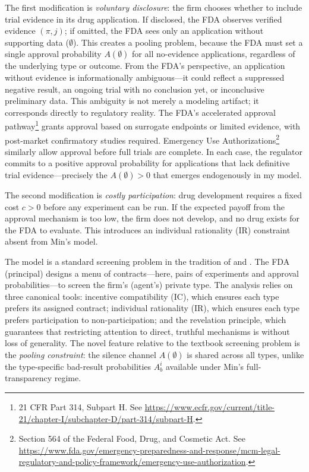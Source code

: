 \documentclass[12pt,a4paper]{article}
\begin{document}
The first modification is \emph{voluntary disclosure}: the
firm chooses whether to include trial evidence in its drug
application. If disclosed, the FDA observes verified evidence
$(\pi, j)$; if omitted, the FDA sees only an application
without supporting data ($\emptyset$). This creates a pooling
problem, because the FDA must set a single approval
probability $A(\emptyset)$ for all no-evidence applications,
regardless of the underlying type or outcome. From the FDA's
perspective, an application without evidence is
informationally ambiguous---it could reflect a suppressed
negative result, an ongoing trial with no conclusion yet, or
inconclusive preliminary data. This ambiguity is not merely a
modeling artifact; it corresponds directly to regulatory
reality. The FDA's accelerated approval
pathway\footnote{21 CFR Part 314, Subpart H. See
\url{https://www.ecfr.gov/current/title-21/chapter-I/subchapter-D/part-314/subpart-H}.}
grants approval based on surrogate endpoints or limited
evidence, with post-market confirmatory studies required.
Emergency Use Authorizations\footnote{Section 564 of the
Federal Food, Drug, and Cosmetic Act. See
\url{https://www.fda.gov/emergency-preparedness-and-response/mcm-legal-regulatory-and-policy-framework/emergency-use-authorization}.}
similarly allow approval before full trials are complete. In each case, the
regulator commits to a positive approval probability for
applications that lack definitive trial evidence---precisely
the $A(\emptyset) > 0$ that emerges endogenously in my model.

The second modification is \emph{costly participation}: drug
development requires a fixed cost $c > 0$ before any
experiment can be run. If the expected payoff from the
approval mechanism is too low, the firm does not develop, and
no drug exists for the FDA to evaluate. This introduces an
individual rationality (IR) constraint absent from Min's
model.

The model is a standard screening problem in the tradition of
\citet{maskinriley1984} and \citet{mussarosen1978}. The FDA
(principal) designs a menu of contracts---here, pairs of
experiments and approval probabilities---to screen the firm's
(agent's) private type. The analysis relies on three
canonical tools: incentive compatibility (IC), which ensures
each type prefers its assigned contract; individual
rationality (IR), which ensures each type prefers
participation to non-participation; and the revelation
principle, which guarantees that restricting attention to
direct, truthful mechanisms is without loss of generality.
The novel feature relative to the textbook screening problem
is the \emph{pooling constraint}: the silence channel
$A(\emptyset)$ is shared across all types, unlike the
type-specific bad-result probabilities $A_b^i$ available
under Min's full-transparency regime.
\end{document}
